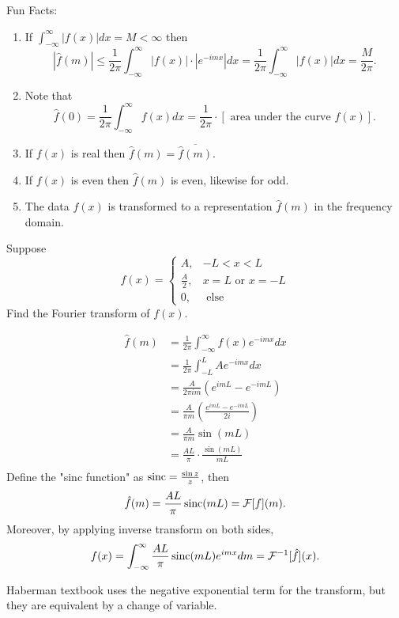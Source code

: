 \documentclass[class=article,crop=false]{standalone}
\begin{document}
Fun Facts:
~\begin{enumerate}[label=\arabic*)]
	\item If $ \int_{-\infty}^{\infty} |f(x)| dx = M<\infty $ then
		\[
			|\hat{ f}(m)|\leq \frac{1}{2\pi} \int_{-\infty}^{\infty} |f(x)| \cdot |e^{-imx}| dx = \frac{1}{2\pi} \int_{-\infty}^{\infty} |f(x)|dx = \frac{M}{2\pi}   
		.\]
	\item Note that
		\[
			\hat{ f}(0)= \frac{1}{2\pi} \int_{-\infty}^{\infty} f(x) dx  = \frac{1}{2\pi} \cdot [ \text{ area under the curve }f(x) ]
		.\] 
	\item If $ f(x)$ is real then  $ \hat{ f}(m)= \overline{\hat{ f}(m)}$.
	\item If $ f(x)$ is even then  $ \hat{ f}(m)$ is even, likewise for odd.
	\item The data $ f(x)$ is transformed to a representation  $ \hat{ f}(m)$ in the frequency domain.
\end{enumerate}

\begin{eg}[]
Suppose
\begin{equation*}
	f(x)=
\begin{cases}
	A, & -L<x<L\\
	\frac{A}{2}, & x=L \text{ or } x=-L\\
	0, & \text{ else} 
\end{cases}
\end{equation*}
Find the Fourier transform of $ f(x)$.

 \begin{align*}
	 \hat{ f}(m) &= \frac{1}{2\pi} \int_{-\infty}^{\infty} f(x)e^{-imx} dx  \\
	 &= \frac{1}{2\pi} \int_{-L}^{L} A e^{-imx} dx  \\
	 &= \frac{A}{2\pi i m} (e^{imL} - e^{-imL}) \\
	 &= \frac{A}{\pi m } \left( \frac{e^{imL}-e^{-imL}}{2i } \right) \\
	 &= \frac{A}{\pi m } \sin(mL ) \\
	 &= \frac{AL}{ \pi} \cdot \frac{\sin(mL )}{mL } \\
\end{align*}
Define the "sinc function" as $ \operatorname{sinc} = \frac{\sin z}{z }$, then
\[
	\hat{ f}(m) = \frac{AL}{\pi} \operatorname{sinc}(mL) = \mathcal{F}[f](m)
.\] 
Moreover, by applying inverse transform on both sides,
\[
	f(x) = \int_{-\infty}^{\infty} \frac{AL}{\pi } \operatorname{sinc} (mL) e^{imx} dm = \mathcal{F}^{-1}[\hat{ f}](x)
.\] 
\end{eg}

\begin{notation}
	Haberman textbook uses the negative exponential term for the transform, but they are equivalent by a change of variable. 
\end{notation}
\end{document}
